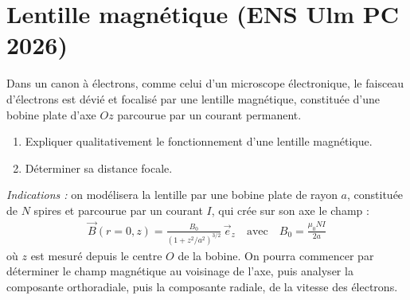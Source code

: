 \newpage

\section{Lentille magnétique (ENS Ulm PC 2026)}

Dans un canon à électrons, comme celui d'un microscope électronique, le faisceau d'électrons est dévié et focalisé par une lentille magnétique, constituée d'une bobine plate d'axe $Oz$ parcourue par un courant permanent.

\begin{enumerate}

	\item Expliquer qualitativement le fonctionnement d'une lentille magnétique.

	\item Déterminer sa distance focale.

\end{enumerate}

\textit{Indications :} on modélisera la lentille par une bobine plate de rayon $a$, constituée de $N$ spires et parcourue par un courant $I$, qui crée sur son axe le champ :
\begin{align*}
	\vec{B}(r=0,z)=\frac{B_0}{\left(1+z^2/a^2\right)^{3/2}}\,\vec{e}_z \quad\text{avec}\quad B_0=\frac{\mu_0NI}{2a}
\end{align*}
où $z$ est mesuré depuis le centre $O$ de la bobine. On pourra commencer par déterminer le champ magnétique au voisinage de l'axe, puis analyser la composante orthoradiale, puis la composante radiale, de la vitesse des électrons.

\newpage

